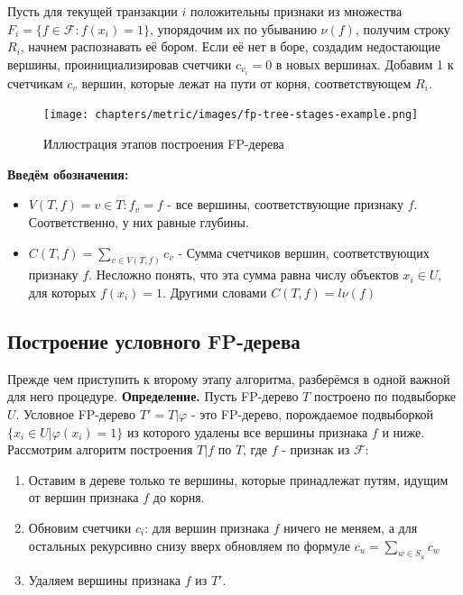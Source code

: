 Пусть для текущей транзакции $i$ положительны признаки из множества $F_i = \{f \in \mathcal{F}: f(x_i) = 1 \}$, упорядочим их по убыванию $\nu(f)$, получим строку $R_i$, начнем распознавать её бором. Если её нет в боре, создадим недостающие вершины, проинициализировав счетчики $c_{v_i} = 0$ в новых вершинах. Добавим 1 к счетчикам $c_v$ вершин, которые лежат на пути от корня, соответствующем $R_i$.

\begin{figure}[h]
    \centering
    \texttt{[image: chapters/metric/images/fp-tree-stages-example.png]}
    \caption{Иллюстрация этапов построения FP-дерева}
    \label{fig:enter-label}
\end{figure}

\textbf{Введём обозначения:}

\begin{itemize}
    \item $V(T, f) = {v \in T: f_v = f}$ - все вершины, соответствующие признаку $f$. Соответственно, у них равные глубины.
    \item $C(T, f) = \displaystyle\sum_{v \in V(T, f)} c_v$ - Сумма счетчиков вершин, соответствующих признаку $f$. Несложно понять, что эта сумма равна числу объектов $x_i \in U$, для которых $f(x_i) = 1$. Другими словами $C(T, f) = l\nu(f)$
\end{itemize}


\subsection{Построение условного FP-дерева}

Прежде чем приступить к второму этапу алгоритма, разберёмся в одной важной для него процедуре. 
\newline\newline
\textbf{Определение.} Пусть FP-дерево $T$ построено по подвыборке $U$. Условное FP-дерево $T' = T|\varphi$ - это FP-дерево, порождаемое подвыборкой $\{x_i \in U| \varphi(x_i) = 1 \}$ из которого удалены все вершины признака $f$ и ниже.
\newline\newline
Рассмотрим алгоритм построения $T|f$ по $T$, где $f$ - признак из $\mathcal{F}$:
\begin{enumerate}
    \item Оставим в дереве только те вершины, которые принадлежат путям, идущим от вершин признака $f$ до корня. 
    \item Обновим счетчики $c_i$: для вершин признака $f$ ничего не меняем, а для остальных рекурсивно снизу вверх обновляем по формуле $c_u = \displaystyle\sum_{w \in S_u} c_w$
    \item Удаляем вершины признака $f$ из $T'$.
\end{enumerate}

